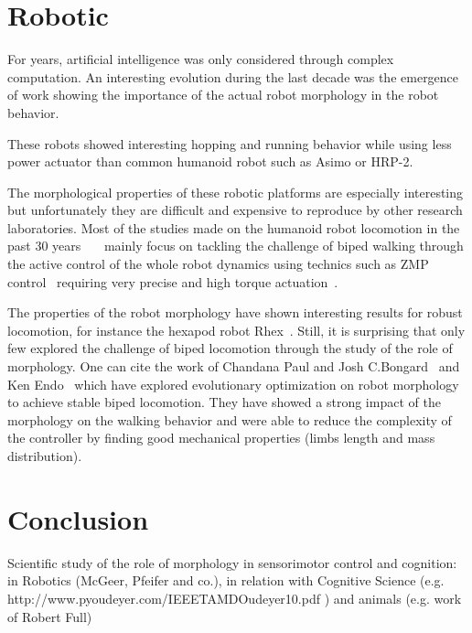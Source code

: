 \section{Robotic} %
For years, artificial intelligence was only considered through complex computation.
An interesting evolution during the last decade was the emergence of work showing the importance of the actual robot morphology in the robot behavior.






These robots showed interesting hopping and running behavior while using less power actuator than common humanoid robot such as Asimo or HRP-2.



The morphological properties of these robotic platforms are especially interesting but unfortunately they are difficult and expensive to reproduce by other research laboratories.
Most of the studies made on the humanoid robot locomotion in the past 30 years~\cite{park1998biped}~\cite{aoi2005locomotion}~\cite{park1998biped} mainly focus on tackling the challenge of biped walking through the active control of the whole robot dynamics using technics such as ZMP control~\cite{vukobratovic2004zero} requiring very precise and high torque actuation~\cite{akachi2005development}.

The properties of the robot morphology have shown interesting results for robust locomotion, for instance the hexapod robot Rhex~\cite{saranli2001rhex}.
Still, it is surprising that only few explored the challenge of biped locomotion through the study of the role of morphology.
One can cite the work of Chandana Paul and Josh C.Bongard~\cite{paul2001road} and Ken Endo~\cite{endo2002co} which have explored evolutionary optimization on robot morphology to achieve stable biped locomotion.
They have showed a strong impact of the morphology on the walking behavior and were able to reduce the complexity of the controller by finding good mechanical properties (limbs length and mass distribution).


\section{Conclusion} %

Scientific study of the role of morphology in sensorimotor control and cognition: in Robotics (McGeer, Pfeifer and co.), in relation with Cognitive Science (e.g.
http://www.pyoudeyer.com/IEEETAMDOudeyer10.pdf ) and animals (e.g.
work of Robert Full)

